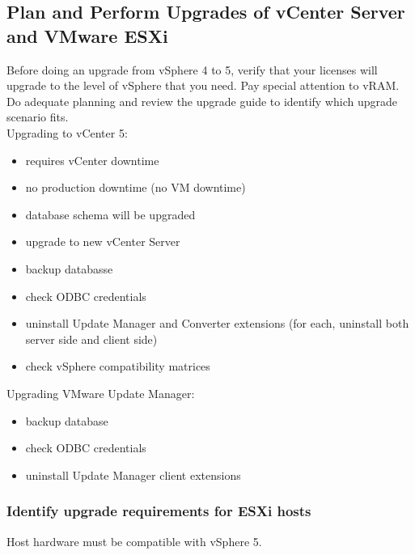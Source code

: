 \subsection{Plan and Perform Upgrades of vCenter Server and VMware ESXi}

Before doing an upgrade from vSphere 4 to 5, verify that your licenses will
upgrade to the level of vSphere that you need. Pay special attention to vRAM.
Do adequate planning and review the upgrade guide to identify which upgrade
scenario fits.\\

Upgrading to vCenter 5:

\begin{itemize}

\item requires vCenter downtime

\item no production downtime (no VM downtime)

\item database schema will be upgraded

\item upgrade to new vCenter Server

\item backup databasse

\item check ODBC credentials

\item uninstall Update Manager and Converter extensions (for each, uninstall
both server side and client side)

\item check vSphere compatibility matrices

\end{itemize}

Upgrading VMware Update Manager:

\begin{itemize}
\item backup database
\item check ODBC credentials
\item uninstall Update Manager client extensions
\end{itemize}

\subsubsection{Identify upgrade requirements for ESXi hosts}

Host hardware must be compatible with vSphere 5.

